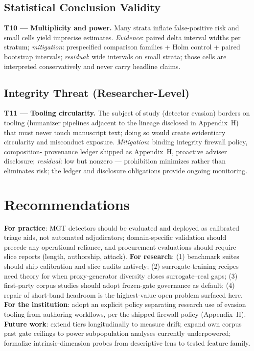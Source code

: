 \subsection{Statistical Conclusion Validity}
\textbf{T10 --- Multiplicity and power.} Many strata inflate false-positive
risk and small cells yield imprecise estimates. \emph{Evidence}: paired
delta interval widths per stratum; \emph{mitigation}: prespecified
comparison families + Holm control + paired bootstrap intervals;
\emph{residual}: wide intervals on small strata; those cells are
interpreted conservatively and never carry headline claims.

\subsection{Integrity Threat (Researcher-Level)}
\textbf{T11 --- Tooling circularity.} The subject of study (detector
evasion) borders on tooling (humanizer pipelines adjacent to the lineage
disclosed in Appendix~H) that must never touch manuscript text; doing so
would create evidentiary circularity and misconduct exposure.
\emph{Mitigation}: binding integrity firewall policy, composition-
provenance ledger shipped as Appendix~H, proactive adviser disclosure;
\emph{residual}: low but nonzero --- prohibition minimizes rather than
eliminates risk; the ledger and disclosure obligations provide ongoing
monitoring.

\section{Recommendations}
\textbf{For practice}: MGT detectors should be evaluated and deployed as
calibrated triage aids, not automated adjudicators; domain-specific
validation should precede any operational reliance, and procurement
evaluations should require slice reports (length, authorship, attack).
\textbf{For research}: (1) benchmark suites should ship calibration and
slice audits natively; (2) surrogate-training recipes need theory for when
proxy-generator diversity closes surrogate--real gaps; (3) first-party
corpus studies should adopt frozen-gate governance as default; (4) repair
of short-band headroom is the highest-value open problem surfaced here.
\textbf{For the institution}: adopt an explicit policy separating research
use of evasion tooling from authoring workflows, per the shipped firewall
policy (Appendix~H).
\textbf{Future work}: extend tiers longitudinally to measure drift;
expand own corpus past gate ceilings to power subpopulation analyses
currently underpowered; formalize intrinsic-dimension probes from
descriptive lens to tested feature family.